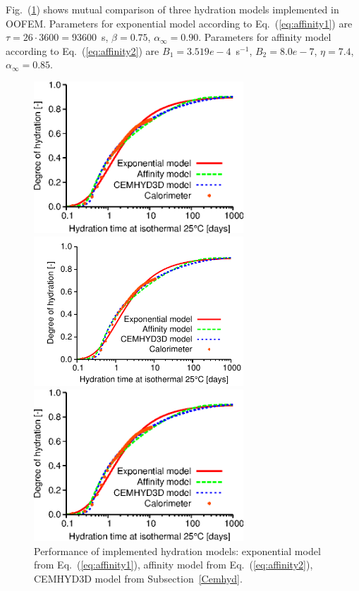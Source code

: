 \documentclass[a4paper]{article}
\newcommand{\refeq}[1]{Eq.~(\ref{#1})}
\newcommand{\reffig}[1]{Fig.~(\ref{#1})}
\begin{document}
\reffig{hydration_comparison} shows mutual comparison of three hydration models implemented in OOFEM. Parameters for exponential model according to \refeq{eq:affinity1} are $\tau=26\cdot3600=93600$~s, $\beta=0.75$, $\alpha_\infty=0.90$. Parameters for affinity model according to \refeq{eq:affinity2} are $B_1=3.519e-4$~s$^{-1}$, $B_2=8.0e-7$, $\eta=7.4$, $\alpha_\infty=0.85$.

\begin{figure}[!htb]
\begin{htmlonly}
  \centerline{\includegraphics[width=0.7\textwidth]{Mokra_OOFEM_affinity_time.eps}}
\end{htmlonly}
\ifpdf
 \centerline{\includegraphics[width=0.7\textwidth]{Mokra_OOFEM_affinity_time.pdf}}
\else
 \centerline{\includegraphics[width=0.7\textwidth]{Mokra_OOFEM_affinity_time.eps}}
\fi
  \caption{Performance of implemented hydration models: exponential model from \refeq{eq:affinity1}, affinity model from \refeq{eq:affinity2}, CEMHYD3D model from Subsection~\ref{Cemhyd}.}
  \label{hydration_comparison}
\end{figure}
\end{document}
